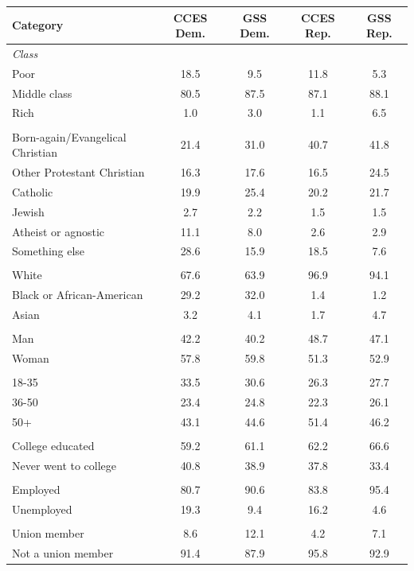 \begin{tabular}{lcccc}
\toprule
Category & CCES Dem. & GSS Dem. & CCES Rep. & GSS Rep. \\
\midrule
\multicolumn{5}{l}{\emph{Class}} \\
Poor & 18.5 & 9.5 & 11.8 & 5.3 \\
Middle class & 80.5 & 87.5 & 87.1 & 88.1 \\
Rich & 1.0 & 3.0 & 1.1 & 6.5 \\
\addlinespace
\multicolumn{5}{l}{\emph{Religion}} \\
Born-again/Evangelical Christian & 21.4 & 31.0 & 40.7 & 41.8 \\
Other Protestant Christian & 16.3 & 17.6 & 16.5 & 24.5 \\
Catholic & 19.9 & 25.4 & 20.2 & 21.7 \\
Jewish & 2.7 & 2.2 & 1.5 & 1.5 \\
Atheist or agnostic & 11.1 & 8.0 & 2.6 & 2.9 \\
Something else & 28.6 & 15.9 & 18.5 & 7.6 \\
\addlinespace
\multicolumn{5}{l}{\emph{Race}} \\
White & 67.6 & 63.9 & 96.9 & 94.1 \\
Black or African-American & 29.2 & 32.0 & 1.4 & 1.2 \\
Asian & 3.2 & 4.1 & 1.7 & 4.7 \\
\addlinespace
\multicolumn{5}{l}{\emph{Sex}} \\
Man & 42.2 & 40.2 & 48.7 & 47.1 \\
Woman & 57.8 & 59.8 & 51.3 & 52.9 \\
\addlinespace
\multicolumn{5}{l}{\emph{Age}} \\
18-35 & 33.5 & 30.6 & 26.3 & 27.7 \\
36-50 & 23.4 & 24.8 & 22.3 & 26.1 \\
50+ & 43.1 & 44.6 & 51.4 & 46.2 \\
\addlinespace
\multicolumn{5}{l}{\emph{Education}} \\
College educated & 59.2 & 61.1 & 62.2 & 66.6 \\
Never went to college & 40.8 & 38.9 & 37.8 & 33.4 \\
\addlinespace
\multicolumn{5}{l}{\emph{Employment}} \\
Employed & 80.7 & 90.6 & 83.8 & 95.4 \\
Unemployed & 19.3 & 9.4 & 16.2 & 4.6 \\
\addlinespace
\multicolumn{5}{l}{\emph{Union membership}} \\
Union member & 8.6 & 12.1 & 4.2 & 7.1 \\
Not a union member & 91.4 & 87.9 & 95.8 & 92.9 \\
\bottomrule
\end{tabular}
